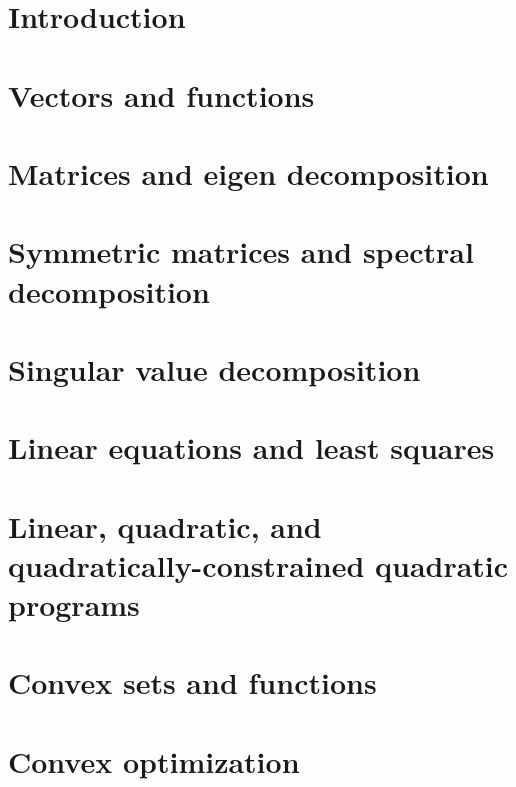 \documentclass{tufte-book} %
\theoremstyle{definition}
\theoremstyle{remark}
\numberwithin{section}{chapter}
\numberwithin{equation}{chapter}
\numberwithin{figure}{chapter}
\begin{document}
\newpage
\mainmatter


\chapter{Introduction}
\label{ch.intro}


\chapter{Vectors and functions}
\label{ch.vecFunc}




\chapter{Matrices and eigen decomposition}
\label{ch.matEig}



\chapter{Symmetric matrices and spectral decomposition}
\label{ch.symmMat}



\chapter{Singular value decomposition}
\label{ch.SVD}


\chapter{Linear equations and least squares}
\label{ch.linEqLS}


\chapter{Linear, quadratic, and quadratically-constrained quadratic programs}
\label{ch.linQuadGeom}


\chapter{Convex sets and functions}
\label{ch.convex}


\chapter{Convex optimization}
\label{ch.convex}

\end{document}
